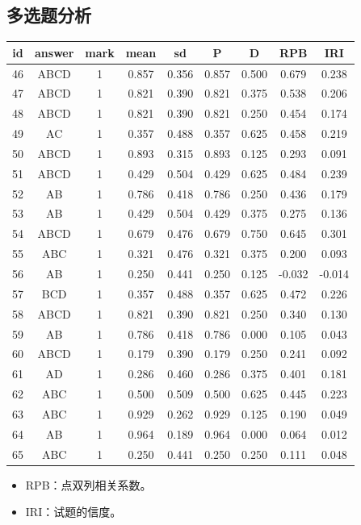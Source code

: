 \documentclass[hyperref,adobefonts]{ctexart}
\providecommand{\tightlist}{\setlength{\itemsep}{0pt}\setlength{\parskip}{0pt}}
\begin{document}
\subsection{多选题分析}

\begin{longtable}{c|c|c|c|c|c|c|c|c}
\hline
id & answer & mark & mean & sd & P & D & RPB & IRI\\
\hline
46 & ABCD & 1 & 0.857 & 0.356 & 0.857 & 0.500 & 0.679 & 0.238\\
\hline
47 & ABCD & 1 & 0.821 & 0.390 & 0.821 & 0.375 & 0.538 & 0.206\\
\hline
48 & ABCD & 1 & 0.821 & 0.390 & 0.821 & 0.250 & 0.454 & 0.174\\
\hline
49 & AC & 1 & 0.357 & 0.488 & 0.357 & 0.625 & 0.458 & 0.219\\
\hline
50 & ABCD & 1 & 0.893 & 0.315 & 0.893 & 0.125 & 0.293 & 0.091\\
\hline
51 & ABCD & 1 & 0.429 & 0.504 & 0.429 & 0.625 & 0.484 & 0.239\\
\hline
52 & AB & 1 & 0.786 & 0.418 & 0.786 & 0.250 & 0.436 & 0.179\\
\hline
53 & AB & 1 & 0.429 & 0.504 & 0.429 & 0.375 & 0.275 & 0.136\\
\hline
54 & ABCD & 1 & 0.679 & 0.476 & 0.679 & 0.750 & 0.645 & 0.301\\
\hline
55 & ABC & 1 & 0.321 & 0.476 & 0.321 & 0.375 & 0.200 & 0.093\\
\hline
56 & AB & 1 & 0.250 & 0.441 & 0.250 & 0.125 & -0.032 & -0.014\\
\hline
57 & BCD & 1 & 0.357 & 0.488 & 0.357 & 0.625 & 0.472 & 0.226\\
\hline
58 & ABCD & 1 & 0.821 & 0.390 & 0.821 & 0.250 & 0.340 & 0.130\\
\hline
59 & AB & 1 & 0.786 & 0.418 & 0.786 & 0.000 & 0.105 & 0.043\\
\hline
60 & ABCD & 1 & 0.179 & 0.390 & 0.179 & 0.250 & 0.241 & 0.092\\
\hline
61 & AD & 1 & 0.286 & 0.460 & 0.286 & 0.375 & 0.401 & 0.181\\
\hline
62 & ABC & 1 & 0.500 & 0.509 & 0.500 & 0.625 & 0.445 & 0.223\\
\hline
63 & ABC & 1 & 0.929 & 0.262 & 0.929 & 0.125 & 0.190 & 0.049\\
\hline
64 & AB & 1 & 0.964 & 0.189 & 0.964 & 0.000 & 0.064 & 0.012\\
\hline
65 & ABC & 1 & 0.250 & 0.441 & 0.250 & 0.250 & 0.111 & 0.048\\
\hline
\end{longtable}

\begin{itemize}
\tightlist
\item
  RPB：点双列相关系数。
\item
  IRI：试题的信度。
\end{itemize}
\end{document}
